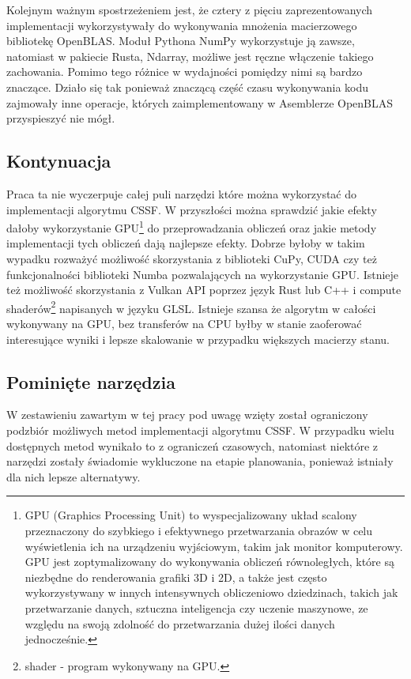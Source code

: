 \documentclass[11pt, a4paper]{article}
\begin{document}
\begin{sloppypar}
    Kolejnym ważnym spostrzeżeniem jest, że cztery z pięciu zaprezentowanych
    implementacji wykorzystywały do wykonywania mnożenia macierzowego bibliotekę
    OpenBLAS. Moduł Pythona NumPy wykorzystuje ją zawsze, natomiast w pakiecie Rusta, Ndarray,
    możliwe jest ręczne włączenie takiego zachowania. Pomimo tego różnice w wydajności pomiędzy
    nimi są bardzo znaczące. Działo się tak ponieważ znaczącą część czasu wykonywania
    kodu zajmowały inne operacje, których zaimplementowany w Asemblerze OpenBLAS przyspieszyć
    nie mógł.

    \subsection{Kontynuacja}
    Praca ta nie wyczerpuje całej puli narzędzi które można wykorzystać do implementacji
    algorytmu CSSF. W przyszłości można sprawdzić jakie efekty dałoby wykorzystanie GPU\footnote{GPU
    (Graphics Processing Unit) to wyspecjalizowany układ scalony przeznaczony do szybkiego
    i efektywnego przetwarzania obrazów w celu wyświetlenia ich na urządzeniu wyjściowym,
    takim jak monitor komputerowy. GPU jest zoptymalizowany do wykonywania obliczeń równoległych,
    które są niezbędne do renderowania grafiki 3D i 2D, a także jest często wykorzystywany
    w innych intensywnych obliczeniowo dziedzinach, takich jak przetwarzanie danych, sztuczna
    inteligencja czy uczenie maszynowe, ze względu na swoją zdolność do przetwarzania
    dużej ilości danych jednocześnie.} do przeprowadzania obliczeń oraz jakie metody
    implementacji tych obliczeń dają najlepsze efekty. Dobrze byłoby w takim wypadku rozważyć
    możliwość skorzystania z biblioteki CuPy, CUDA czy też funkcjonalności biblioteki
    Numba pozwalających na wykorzystanie GPU. Istnieje też możliwość skorzystania z Vulkan
    API poprzez język Rust lub C++ i compute shaderów\footnote{shader - program
    wykonywany na GPU.} napisanych w języku GLSL. Istnieje szansa że algorytm w całości wykonywany
    na GPU, bez transferów na CPU byłby w stanie zaoferować interesujące wyniki i lepsze
    skalowanie w przypadku większych macierzy stanu.

    \subsection{Pominięte narzędzia}
    W zestawieniu zawartym w tej pracy pod uwagę wzięty został ograniczony podzbiór
    możliwych metod implementacji algorytmu CSSF. W przypadku wielu dostępnych metod wynikało
    to z ograniczeń czasowych, natomiast niektóre z narzędzi zostały świadomie
    wykluczone na etapie planowania, ponieważ istniały dla nich lepsze alternatywy.


\end{sloppypar}
\end{document}
